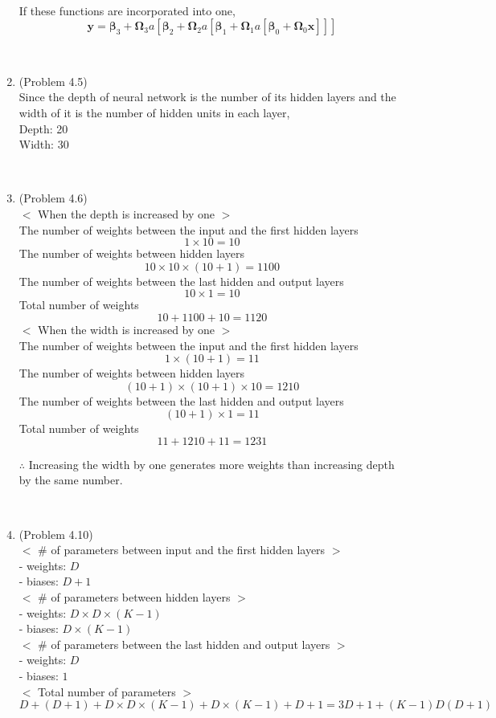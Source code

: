 \documentclass[10pt]{article}
\begin{document}
\begin{enumerate}
	\
	
	If these functions are incorporated into one, \\
	$$\boldsymbol{y}=\boldsymbol{\beta}_3+\boldsymbol{\Omega}_3 a[\boldsymbol{\beta}_2+\boldsymbol{\Omega}_2 a[\boldsymbol{\beta}_1+\boldsymbol{\Omega}_1 a[\boldsymbol{\beta}_0+\boldsymbol{\Omega}_0 \boldsymbol{x}]]]$$

\

\item (Problem 4.5) \\
	Since the depth of neural network is the number of its hidden layers and the width of it is the number of hidden units in each layer, \\
	Depth: 20 \\
	Width: 30

\
	
\item (Problem 4.6) \\
	$<$ When the depth is increased by one $>$ \\
	The number of weights between the input and the first hidden layers \\
	$$1 \times 10=10$$
	The number of weights between hidden layers
	$$10 \times 10 \times (10+1)=1100$$
	The number of weights between the last hidden and output layers
	$$10 \times 1=10$$
	Total number of weights \\
	$$10+1100+10=1120$$
	$<$ When the width is increased by one $>$ \\
	The number of weights between the input and the first hidden layers \\
	$$1 \times (10+1)=11$$
	The number of weights between hidden layers
	$$(10+1) \times (10+1) \times 10=1210$$
	The number of weights between the last hidden and output layers
	$$(10+1) \times 1=11$$
	Total number of weights \\
	$$11+1210+11=1231$$
	
	$\therefore$ Increasing the width by one generates more weights than increasing depth by the same number.

\

\item (Problem 4.10) \\
	$<$ \# of parameters between input and the first hidden layers $>$ \\
	- weights: $D$ \\
	- biases: $D+1$ \\
	$<$ \# of parameters between hidden layers $>$ \\
	- weights: $D \times D \times (K-1)$ \\
	- biases: $D \times (K-1)$ \\
	$<$ \# of parameters between the last hidden and output layers $>$ \\
	- weights: $D$ \\
	- biases: $1$ \\
	$<$ Total number of parameters $>$ \\
	$$D+(D+1)+D \times D \times (K-1)+D \times (K-1)+D+1=3D+1+(K-1)D(D+1)$$

\

\end{enumerate}
\end{document}
